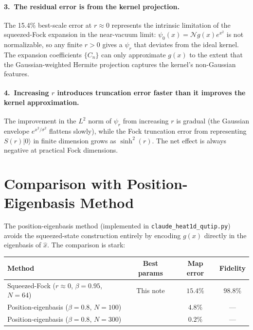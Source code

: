 \documentclass[11pt]{article}
\begin{document}
\paragraph{3.\ The residual error is from the kernel projection.}
The 15.4\% best-scale error at $r \approx 0$ represents the intrinsic
limitation of the squeezed-Fock expansion in the near-vacuum limit:
$\psi_0(x) = \mathcal{N}g(x)e^{x^2}$ is not normalizable, so any finite
$r > 0$ gives a $\psi_r$ that deviates from the ideal kernel.  The
expansion coefficients $\{C_n\}$ can only approximate $g(x)$ to the extent
that the Gaussian-weighted Hermite projection captures the kernel's
non-Gaussian features.

\paragraph{4.\ Increasing $r$ introduces truncation error faster than it
improves the kernel approximation.}
The improvement in the $L^2$ norm of $\psi_r$ from increasing $r$ is
gradual (the Gaussian envelope $e^{x^2/\sigma^2}$ flattens slowly), while
the Fock truncation error from representing $S(r)|0\rangle$ in finite
dimension grows as $\sinh^2(r)$.  The net effect is always negative at
practical Fock dimensions.

\section{Comparison with Position-Eigenbasis Method}

The position-eigenbasis method (implemented in \texttt{claude\_heat1d\_qutip.py})
avoids the squeezed-state construction entirely by encoding $g(x)$ directly
in the eigenbasis of $\hat{x}$.  The comparison is stark:

\begin{center}
\begin{tabular}{lccc}
  \toprule
  Method & Best params & Map error & Fidelity \\
  \midrule
  Squeezed-Fock ($r \approx 0$, $\beta = 0.95$, $N=64$)
    & This note & $15.4\%$ & $98.8\%$ \\
  Position-eigenbasis ($\beta = 0.8$, $N = 100$)
    & \cite{claude_xbasis} & $4.8\%$ & --- \\
  Position-eigenbasis ($\beta = 0.8$, $N = 300$)
    & \cite{claude_xbasis} & $0.2\%$ & --- \\
  \bottomrule
\end{tabular}
\end{center}
\end{document}
